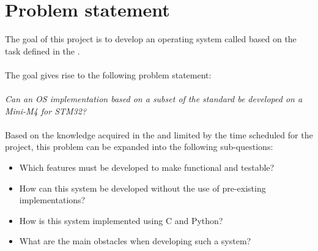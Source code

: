 \chapter{Problem statement}
\label{chap:Problem_Statement}

The goal of this project is to develop an \arinc{}
operating system called \OSname{} based on the task defined in the
.
\\\\
The goal gives rise to the following problem statement:
\\\\
\textit{Can an OS implementation based on a subset of the \arinc{} standard be
developed on a Mini-M4 for STM32?}
\\\\
Based on the knowledge acquired in the 
and limited by the time scheduled for the project, this problem can be expanded
into the following sub-questions:

\begin{itemize}
	\item Which features must be developed to make \OSname{} functional and
		testable?
	\item How can this system be developed without the use of pre-existing
		implementations?
	\item How is this system implemented using C and Python?
	\item What are the main obstacles when developing such a system?
\end{itemize}
